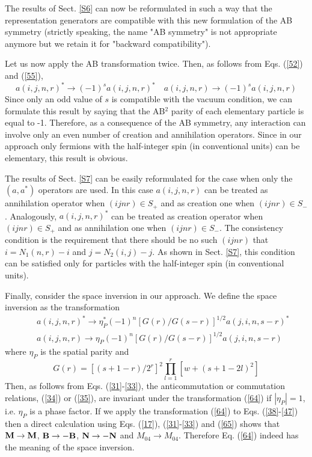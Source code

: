 \documentclass[a4paper,12pt]{article}%
\begin{document}
The results of Sect. \ref{S6} can now be reformulated in
such a way that the representation generators are compatible 
with this new formulation of the AB symmetry (strictly 
speaking, the name "AB symmetry" is not appropriate anymore
but we retain it for "backward compatibility"). 

Let us now apply the AB transformation twice. Then, as follows 
from Eqs. (\ref{52}) and (\ref{55}), 
\begin{equation}
a(i,j,n,r)^*\rightarrow (-1)^sa(i,j,n,r)^*\quad
a(i,j,n,r)\rightarrow (-1)^sa(i,j,n,r)
\label{63}
\end{equation} 
Since only an odd value of $s$ is compatible with
the vacuum condition, we can formulate this result
by saying that the AB$^2$ parity of each elementary
particle is equal to -1. Therefore, as a consequence
of the AB symmetry, any interaction can involve 
only an even number of creation and annihilation 
operators. Since in our approach only fermions 
with the half-integer spin (in conventional units)
can be elementary, this result is obvious.

The results of Sect. \ref{S7} can be easily
reformulated for the case when only the $(a,a^*)$
operators are used. In this case $a(i,j,n,r)$ can
be treated as annihilation operator when 
$(ijnr)\in S_+$ and as creation one when
$(ijnr)\in S_-$. Analogously, $a(i,j,n,r)^*$ can
be treated as creation operator when 
$(ijnr)\in S_+$ and as annihilation one when
$(ijnr)\in S_-$. The consistency condition is
the requirement that there should be no such 
$(ijnr)$ that $i=N_1(n,r)-i$ and
$j=N_2(i,j)-j$. As shown in Sect. \ref{S7},
this condition can be satisfied only for particles
with the half-integer spin (in conventional units).

Finally, consider the space inversion in our approach.
We define the space inversion as the transformation
\begin{eqnarray}
&&a(i,j,n,r)^*\rightarrow \eta_P^* (-1)^n 
[G(r)/G(s-r)]^{1/2}a(j,i,n,s-r)^*\nonumber\\
&&a(i,j,n,r)\rightarrow \eta_P (-1)^n 
[G(r)/G(s-r)]^{1/2}a(j,i,n,s-r)
\label{64}
\end{eqnarray}
where $\eta_P$ is the spatial parity and
\begin{equation}
G(r)=[(s+1-r)/2^r]^2 \prod_{l=1}^r [w+(s+1-2l)^2]
\label{65}
\end{equation} 
Then, as follows from Eqs. (\ref{31}-\ref{33}),
the anticommutation or commutation relations,
(\ref{34}) or (\ref{35}), are invariant under 
the transformation (\ref{64}) if $|\eta_P|=1$,
i.e. $\eta_P$ is a phase factor. 
If we apply the transformation (\ref{64}) to
Eqs. (\ref{38}-\ref{47}) then a direct calculation
using Eqs. (\ref{17}), (\ref{31}-\ref{33}) and
(\ref{65}) shows that ${\bf M}\rightarrow {\bf M}$,
${\bf B}\rightarrow -{\bf B}$, 
${\bf N}\rightarrow -{\bf N}$ and
$M_{04}\rightarrow M_{04}$. Therefore Eq. (\ref{64})
indeed has the meaning of the space inversion. 
\end{document}
